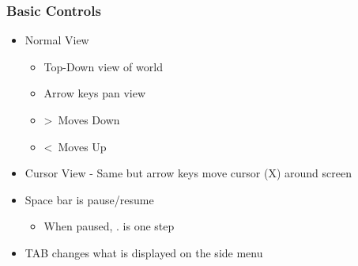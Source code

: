 \begin{frame}
\frametitle{Basic Controls}
\begin{itemize}
\item Normal View
\begin{itemize}
	\item Top-Down view of world
	\item Arrow keys pan view
	\item \textgreater \ Moves Down
	\item \textless \ Moves Up
\end{itemize}
\item Cursor View - Same but arrow keys move cursor (X) around screen
\item Space bar is pause/resume
\begin{itemize}
	\item When paused, . is one step
\end{itemize}
\item TAB changes what is displayed on the side menu
\end{itemize}
\end{frame}

